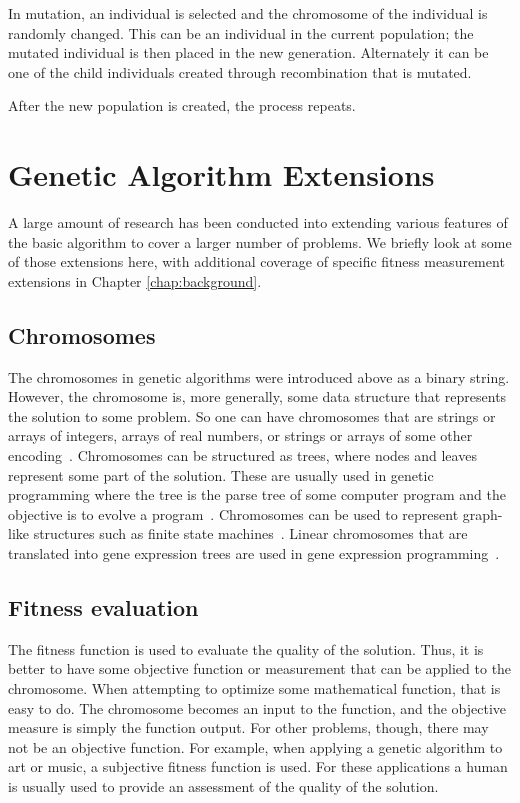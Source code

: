 In mutation, an individual is selected and the chromosome of the individual is
randomly changed. This can be an individual in the current population; the
mutated individual is then placed in the new generation. Alternately it can be
one of the child individuals created through recombination that is mutated.

After the new population is created, the process repeats.

\section{Genetic Algorithm Extensions}

A large amount of research has been conducted into extending various features of
the basic algorithm to cover a larger number of problems. We briefly look at
some of those extensions here, with additional coverage of specific fitness
measurement extensions in Chapter \ref{chap:background}.

\subsection{Chromosomes}

The chromosomes in genetic algorithms were introduced above as a binary string.
However, the chromosome is, more generally, some data structure that represents
the solution to some problem. So one can have chromosomes that are strings or
arrays of integers, arrays of real numbers, or strings or arrays of some other
encoding~\cite{haupt2004practical}. Chromosomes can be structured as trees,
where nodes and leaves represent some part of the solution. These are usually
used in genetic programming where the tree is the parse tree of some computer
program and the objective is to evolve a program~\cite{koza1992genetic}.
Chromosomes can be used to represent graph-like structures such as finite state
machines~\cite{fogel1999intelligence,fogel2000evolutionary}. Linear chromosomes
that are translated into gene expression trees are used in gene expression
programming~\cite{ferreira2012gene}.

\subsection{Fitness evaluation}

The fitness function is used to evaluate the quality of the solution. Thus, it
is better to have some objective function or measurement that can be applied to
the chromosome. When attempting to optimize some mathematical function, that is
easy to do. The chromosome becomes an input to the function, and the objective
measure is simply the function output. For other problems, though, there may not
be an objective function. For example, when applying a genetic algorithm to art
or music, a subjective fitness function is used. For these applications a human
is usually used to provide an assessment of the quality of the solution.

